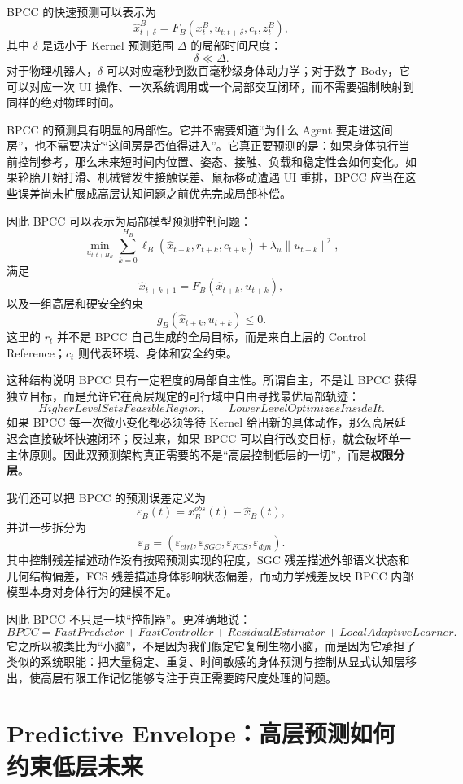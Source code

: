 BPCC 的快速预测可以表示为
\[
\hat x_{t+\delta}^{B}
=
F_B
\left(
x_t^B,
u_{t:t+\delta},
c_t,
z_t^B
\right),
\]
其中 $\delta$ 是远小于 Kernel 预测范围 $\Delta$ 的局部时间尺度：
\[
\boxed{
\delta\ll\Delta.
}
\]
对于物理机器人，$\delta$ 可以对应毫秒到数百毫秒级身体动力学；对于数字 Body，它可以对应一次 UI 操作、一次系统调用或一个局部交互闭环，而不需要强制映射到同样的绝对物理时间。

BPCC 的预测具有明显的局部性。它并不需要知道“为什么 Agent 要走进这间房”，也不需要决定“这间房是否值得进入”。它真正要预测的是：如果身体执行当前控制参考，那么未来短时间内位置、姿态、接触、负载和稳定性会如何变化。如果轮胎开始打滑、机械臂发生接触误差、鼠标移动遭遇 UI 重排，BPCC 应当在这些误差尚未扩展成高层认知问题之前优先完成局部补偿。

因此 BPCC 可以表示为局部模型预测控制问题：
\[
\min_{u_{t:t+H_B}}
\sum_{k=0}^{H_B}
\ell_B
\left(
\hat x_{t+k},
r_{t+k},
c_{t+k}
\right)
+
\lambda_u
\|u_{t+k}\|^2,
\]
满足
\[
\hat x_{t+k+1}
=
F_B
(\hat x_{t+k},u_{t+k}),
\]
以及一组高层和硬安全约束
\[
g_B(\hat x_{t+k},u_{t+k})\leq0.
\]
这里的 $r_t$ 并不是 BPCC 自己生成的全局目标，而是来自上层的 Control Reference；$c_t$ 则代表环境、身体和安全约束。

这种结构说明 BPCC 具有一定程度的局部自主性。所谓自主，不是让 BPCC 获得独立目标，而是允许它在高层规定的可行域中自由寻找最优局部轨迹：
\[
\boxed{
HigherLevelSetsFeasibleRegion,
\qquad
LowerLevelOptimizesInsideIt.
}
\]
如果 BPCC 每一次微小变化都必须等待 Kernel 给出新的具体动作，那么高层延迟会直接破坏快速闭环；反过来，如果 BPCC 可以自行改变目标，就会破坏单一主体原则。因此双预测架构真正需要的不是“高层控制低层的一切”，而是\textbf{权限分层}。

我们还可以把 BPCC 的预测误差定义为
\[
\varepsilon_B(t)
=
x_B^{obs}(t)
-
\hat x_B(t),
\]
并进一步拆分为
\[
\varepsilon_B
=
(
\varepsilon_{ctrl},
\varepsilon_{SGC},
\varepsilon_{FCS},
\varepsilon_{dyn}
).
\]
其中控制残差描述动作没有按照预测实现的程度，SGC 残差描述外部语义状态和几何结构偏差，FCS 残差描述身体影响状态偏差，而动力学残差反映 BPCC 内部模型本身对身体行为的建模不足。

因此 BPCC 不只是一块“控制器”。更准确地说：
\[
\boxed{
BPCC
=
FastPredictor
+
FastController
+
ResidualEstimator
+
LocalAdaptiveLearner.
}
\]
它之所以被类比为“小脑”，不是因为我们假定它复制生物小脑，而是因为它承担了类似的系统职能：把大量稳定、重复、时间敏感的身体预测与控制从显式认知层移出，使高层有限工作记忆能够专注于真正需要跨尺度处理的问题。

\section{Predictive Envelope：高层预测如何约束低层未来}

